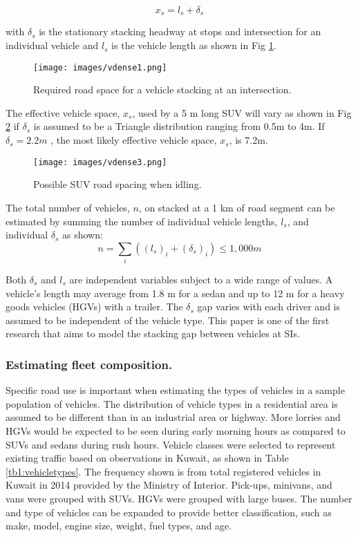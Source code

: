 \documentclass[preprint,12pt,a4paper]{elsarticle}
\begin{document}
\begin{linenumbers}
\begin{equation}
\label{eq:roadspace}
x_{s}= l_{s} +\delta_{s}
\end{equation}

\noindent
with $\delta_{s}$ is the stationary stacking headway at stops and intersection for an individual vehicle and $l_{s}$ is the vehicle length as shown in Fig \ref{fig1:roadspace}.

\begin{figure}[H]
\texttt{[image: images/vdense1.png]} 
\caption{Required road space for a vehicle stacking at an intersection.}
\label{fig1:roadspace}
\end{figure}
%
 The effective vehicle space, $x_{s}$, used by a 5 m long SUV will vary as shown in Fig \ref{fig3:SUVspace} if $\delta_{s}$ is assumed to be a Triangle distribution ranging from 0.5m to 4m.  If $\delta_{s} = 2.2m$ , the most likely effective vehicle space, $x_{s}$,  is  7.2m.
%
\begin{figure}[H]
\texttt{[image: images/vdense3.png]} 
\caption{Possible SUV road spacing when idling.}
\label{fig3:SUVspace}
\end{figure}
%

The total number of vehicles, $n$, on stacked at a 1 km of road segment can be estimated by summing the number of individual vehicle lengths, $l_{s}$, and individual $\delta_{s}$ as shown:
% 
\begin{equation}
\label{eq1:roadspace}
n = \sum_{i}\left ({(l_{s})_{i} +(\delta_{s})_{i}} \right )\leq 1,000m 
\end{equation}
%

Both $\delta_{s}$ and $l_{s}$ are independent variables subject to a wide range of values.  A vehicle's length may average from 1.8 m for a sedan and up to 12 m for a heavy goods vehicles (HGVs) with a trailer. The $\delta_{s}$ gap varies with each driver and is assumed to be independent of the vehicle type. This paper is one of the first research that aims to model the stacking gap between vehicles at SIs.

\subsubsection{Estimating fleet composition.}
Specific road use is important when estimating the types of vehicles in a sample population of vehicles.  The distribution of vehicle types in a residential area is assumed to be different than in an industrial area or highway. More lorries and HGVs would be expected to be seen during early morning hours as compared to SUVs and sedans during rush hours. Vehicle classes were selected to represent existing traffic based on observations in Kuwait, as shown in Table \ref{tb1:vehicletypes}. The frequency shown is from total registered vehicles in Kuwait in 2014 provided by the Ministry of Interior. Pick-ups, minivans, and vans were grouped with SUVs. HGVs were grouped with large buses. The number and type of vehicles can be expanded to provide better classification, such as make, model, engine size, weight, fuel types, and age.


\end{linenumbers}
\end{document}
